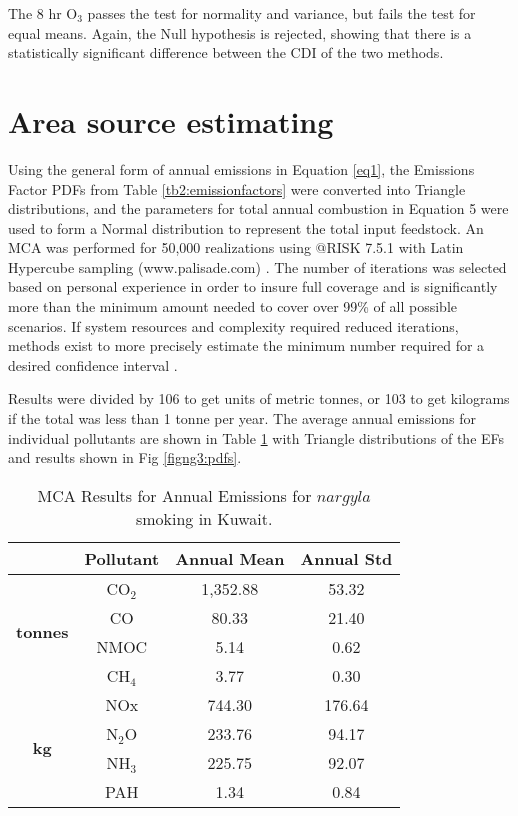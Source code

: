The 8 hr O$_{3}$ passes the test for normality and variance, but fails the test for equal means. Again, the Null hypothesis is rejected, showing that there is a statistically significant difference between the CDI of the two methods.
\clearpage

\section{Area source estimating}

Using the general form of annual emissions in Equation \ref{eq1}, the Emissions Factor PDFs from Table \ref{tb2:emissionfactors} were converted into Triangle distributions, and the parameters for total annual combustion in Equation 5 were used to form a Normal distribution to represent the total input feedstock.  An MCA was performed for 50,000 realizations using @RISK 7.5.1 with Latin Hypercube sampling (www.palisade.com) . The number of iterations was selected based on personal experience  in order to insure full coverage and is significantly more than the minimum amount needed to cover over 99\% of all possible scenarios.  If system resources and complexity required reduced iterations, methods exist to more precisely estimate the minimum number required for a desired confidence interval \citep{Bukaci2016}.

Results were divided by 106 to get units of metric tonnes, or 103 to get kilograms if the total was less than 1 tonne per year.  The average annual emissions for individual pollutants are shown in Table \ref{tb4:results} with Triangle distributions of the EFs and results shown in Fig \ref{figng3:pdfs}. 

%
\begin{table}[H]
\centering
\caption{MCA Results for Annual Emissions for $nargyla$ smoking in Kuwait.}
\label{tb4:results}
\begin{tabular}{@{}cccc@{}}
\toprule
 & \textbf{Pollutant} & \textbf{Annual Mean} & \textbf{Annual Std} \\ \midrule
\multirow{4}{*}{\textbf{tonnes}} & CO$_{2}$ & 1,352.88 & 53.32 \\
 & CO & 80.33 & 21.40 \\
 & NMOC & 5.14 & 0.62 \\
 & CH$_{4}$ & 3.77 & 0.30 \\ \midrule
\multirow{4}{*}{\textbf{kg}} & NOx & 744.30 & 176.64 \\
 & N$_{2}$O & 233.76 & 94.17 \\
 & NH$_{3}$ & 225.75 & 92.07 \\
 & PAH & 1.34 & 0.84 \\ \bottomrule 
\end{tabular}
\end{table}
% 
 
